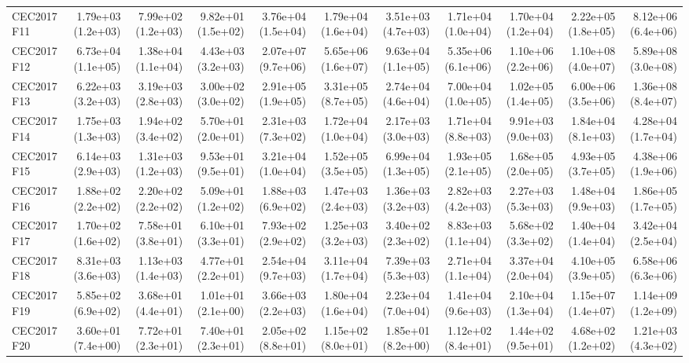 \begin{longtable}{lrrrrrrrrrr}
CEC2017 F11 & 1.79e+03 (1.2e+03) & 7.99e+02 (1.2e+03) & 9.82e+01 (1.5e+02) & 3.76e+04 (1.5e+04) & 1.79e+04 (1.6e+04) & 3.51e+03 (4.7e+03) & 1.71e+04 (1.0e+04) & 1.70e+04 (1.2e+04) & 2.22e+05 (1.8e+05) & 8.12e+06 (6.4e+06) \\
CEC2017 F12 & 6.73e+04 (1.1e+05) & 1.38e+04 (1.1e+04) & 4.43e+03 (3.2e+03) & 2.07e+07 (9.7e+06) & 5.65e+06 (1.6e+07) & 9.63e+04 (1.1e+05) & 5.35e+06 (6.1e+06) & 1.10e+06 (2.2e+06) & 1.10e+08 (4.0e+07) & 5.89e+08 (3.0e+08) \\
CEC2017 F13 & 6.22e+03 (3.2e+03) & 3.19e+03 (2.8e+03) & 3.00e+02 (3.0e+02) & 2.91e+05 (1.9e+05) & 3.31e+05 (8.7e+05) & 2.74e+04 (4.6e+04) & 7.00e+04 (1.0e+05) & 1.02e+05 (1.4e+05) & 6.00e+06 (3.5e+06) & 1.36e+08 (8.4e+07) \\
CEC2017 F14 & 1.75e+03 (1.3e+03) & 1.94e+02 (3.4e+02) & 5.70e+01 (2.0e+01) & 2.31e+03 (7.3e+02) & 1.72e+04 (1.0e+04) & 2.17e+03 (3.0e+03) & 1.71e+04 (8.8e+03) & 9.91e+03 (9.0e+03) & 1.84e+04 (8.1e+03) & 4.28e+04 (1.7e+04) \\
CEC2017 F15 & 6.14e+03 (2.9e+03) & 1.31e+03 (1.2e+03) & 9.53e+01 (9.5e+01) & 3.21e+04 (1.0e+04) & 1.52e+05 (3.5e+05) & 6.99e+04 (1.3e+05) & 1.93e+05 (2.1e+05) & 1.68e+05 (2.0e+05) & 4.93e+05 (3.7e+05) & 4.38e+06 (1.9e+06) \\
CEC2017 F16 & 1.88e+02 (2.2e+02) & 2.20e+02 (2.2e+02) & 5.09e+01 (1.2e+02) & 1.88e+03 (6.9e+02) & 1.47e+03 (2.4e+03) & 1.36e+03 (3.2e+03) & 2.82e+03 (4.2e+03) & 2.27e+03 (5.3e+03) & 1.48e+04 (9.9e+03) & 1.86e+05 (1.7e+05) \\
CEC2017 F17 & 1.70e+02 (1.6e+02) & 7.58e+01 (3.8e+01) & 6.10e+01 (3.3e+01) & 7.93e+02 (2.9e+02) & 1.25e+03 (3.2e+03) & 3.40e+02 (2.3e+02) & 8.83e+03 (1.1e+04) & 5.68e+02 (3.3e+02) & 1.40e+04 (1.4e+04) & 3.42e+04 (2.5e+04) \\
CEC2017 F18 & 8.31e+03 (3.6e+03) & 1.13e+03 (1.4e+03) & 4.77e+01 (2.2e+01) & 2.54e+04 (9.7e+03) & 3.11e+04 (1.7e+04) & 7.39e+03 (5.3e+03) & 2.71e+04 (1.1e+04) & 3.37e+04 (2.0e+04) & 4.10e+05 (3.9e+05) & 6.58e+06 (6.3e+06) \\
CEC2017 F19 & 5.85e+02 (6.9e+02) & 3.68e+01 (4.4e+01) & 1.01e+01 (2.1e+00) & 3.66e+03 (2.2e+03) & 1.80e+04 (1.6e+04) & 2.23e+04 (7.0e+04) & 1.41e+04 (9.6e+03) & 2.10e+04 (1.3e+04) & 1.15e+07 (1.4e+07) & 1.14e+09 (1.2e+09) \\
CEC2017 F20 & 3.60e+01 (7.4e+00) & 7.72e+01 (2.3e+01) & 7.40e+01 (2.3e+01) & 2.05e+02 (8.8e+01) & 1.15e+02 (8.0e+01) & 1.85e+01 (8.2e+00) & 1.12e+02 (8.4e+01) & 1.44e+02 (9.5e+01) & 4.68e+02 (1.2e+02) & 1.21e+03 (4.3e+02) \\

\end{longtable}
